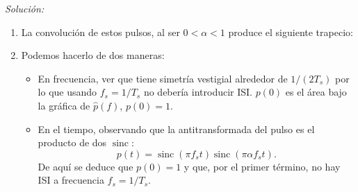 \documentclass[a4paper,11pt]{article}
\DeclareMathOperator{\sinc}{sinc}
\newenvironment{solucion}[1][]{
\noindent \large \textsl{Solución:} \ifthenelse{\equal{#1}{}}{}{\emph{(#1)}}

\smallskip
}{
\bigskip
}
\begin{document}
\begin{solucion}
\begin{enumerate}

        \item La convolución de estos pulsos, al ser $0<\alpha<1$ produce el siguiente trapecio:

        \begin{center}
        \end{center}

        \item Podemos hacerlo de dos maneras:
         \begin{itemize}
          \item En frecuencia, ver que tiene simetría vestigial alrededor de $1/(2T_s)$ por lo que usando $f_s= 1/T_s$ no debería introducir ISI. $p(0)$ es el área bajo la gráfica de $\hat{p}(f)$, $p(0)=1$.
          \item En el tiempo, observando que la antitransformada del pulso es el producto de dos $\sinc$:
           \begin{equation*}
                p(t) = \sinc(\pi f_s t)\sinc(\pi \alpha f_s t).
           \end{equation*}
           De aquí se deduce que $p(0)=1$ y que, por el primer término, no hay ISI a frecuencia $f_s=1/T_s$.
         \end{itemize}


\end{enumerate}
\end{solucion}
\end{document}
